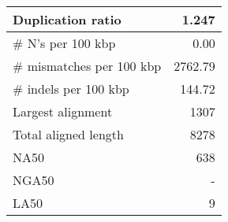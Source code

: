 \documentclass[12pt,a4paper]{article}
\begin{document}
\begin{table}[ht]
\begin{center}
\begin{tabular}{|l*{1}{|r}|}
Duplication ratio & 1.247 \\ \hline
\# N's per 100 kbp & 0.00 \\ \hline
\# mismatches per 100 kbp & 2762.79 \\ \hline
\# indels per 100 kbp & 144.72 \\ \hline
Largest alignment & 1307 \\ \hline
Total aligned length & 8278 \\ \hline
NA50 & 638 \\ \hline
NGA50 & - \\ \hline
LA50 & 9 \\ \hline
\end{tabular}
\end{center}
\end{table}
\end{document}
